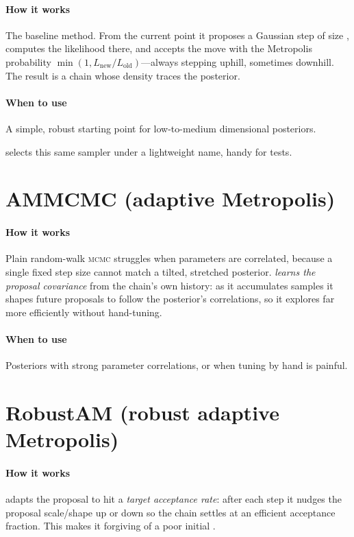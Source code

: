 \paragraph{How it works} The baseline method. From the current point it proposes a Gaussian step of
size , computes the likelihood there, and accepts the move with the
Metropolis probability $\min(1, L_\text{new}/L_\text{old})$---always stepping uphill, sometimes
downhill. The result is a chain whose density traces the posterior.

\paragraph{When to use} A simple, robust starting point for low-to-medium dimensional posteriors.

\begin{jnote}
 selects this same sampler under a lightweight name, handy for tests.
\end{jnote}

\section{AMMCMC (adaptive Metropolis)}
\label{sec:s-ammcmc}

\paragraph{How it works} Plain random-walk \textsc{mcmc} struggles when parameters are correlated,
because a single fixed step size cannot match a tilted, stretched posterior. 
\emph{learns the proposal covariance} from the chain's own history: as it accumulates samples it
shapes future proposals to follow the posterior's correlations, so it explores far more
efficiently without hand-tuning.

\paragraph{When to use} Posteriors with strong parameter correlations, or when tuning
 by hand is painful.

\section{RobustAM (robust adaptive Metropolis)}
\label{sec:s-robustam}

\paragraph{How it works}  adapts the proposal to hit a \emph{target acceptance
rate}: after each step it nudges the proposal scale/shape up or down so the chain settles at an
efficient acceptance fraction. This makes it forgiving of a poor initial .

